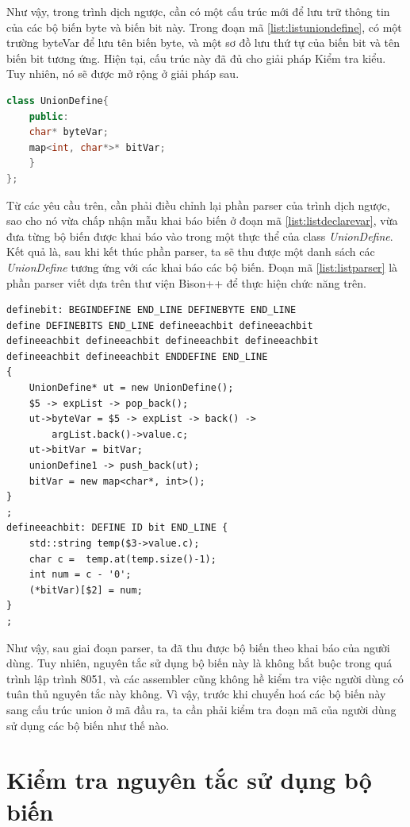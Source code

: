 Như vậy, trong trình dịch ngược, cần có một cấu trúc mới để lưu trữ thông tin của các bộ biến byte và biến bit này. Trong đoạn mã \ref{list:listuniondefine}, có một trường byteVar để lưu tên biến byte, và một sơ đồ lưu thứ tự của biến bit và tên biến bit tương ứng. Hiện tại, cấu trúc này đã đủ cho giải pháp Kiểm tra kiểu. Tuy nhiên, nó sẽ được mở rộng ở giải pháp sau. 
\begin{lstlisting}[caption={Cấu trúc dữ liệu để lưu trữ một bộ biến},label={list:listuniondefine},language=c++]
class UnionDefine{
	public:
	char* byteVar;
	map<int, char*>* bitVar;
	}
};
\end{lstlisting}
Từ các yêu cầu trên, cần phải điều chỉnh lại phần parser của trình dịch ngược, sao cho nó vừa chấp nhận mẫu khai báo biến ở đoạn mã \ref{list:listdeclarevar}, vừa đưa từng bộ biến được khai báo vào trong một thực thể của class \textit{UnionDefine}. Kết quả là, sau khi kết thúc phần parser, ta sẽ thu được một danh sách các \textit{UnionDefine} tương ứng với các khai báo các bộ biến. Đoạn mã \ref{list:listparser} là phần parser viết dựa trên thư viện Bison++ để thực hiện chức năng trên.\\
\begin{lstlisting}[caption={Đoạn mã parser cho phần khai báo bộ biến},label={list:listparser}]
definebit: BEGINDEFINE END_LINE DEFINEBYTE END_LINE 
define DEFINEBITS END_LINE defineeachbit defineeachbit
defineeachbit defineeachbit defineeachbit defineeachbit 
defineeachbit defineeachbit ENDDEFINE END_LINE
{
	UnionDefine* ut = new UnionDefine();
	$5 -> expList -> pop_back();
	ut->byteVar = $5 -> expList -> back() -> 
		argList.back()->value.c;
	ut->bitVar = bitVar;
	unionDefine1 -> push_back(ut);
	bitVar = new map<char*, int>();
}
;
defineeachbit: DEFINE ID bit END_LINE {
	std::string temp($3->value.c);
	char c =  temp.at(temp.size()-1);
	int num = c - '0';
	(*bitVar)[$2] = num;
}
;
\end{lstlisting}
Như vậy, sau giai đoạn parser, ta đã thu được bộ biến theo khai báo của người dùng. Tuy nhiên, nguyên tắc sử dụng bộ biến này là không bắt buộc trong quá trình lập trình 8051, và các assembler cũng không hề kiểm tra việc người dùng có tuân thủ nguyên tắc này không. Vì vậy, trước khi chuyển hoá các bộ biến này sang cấu trúc union ở mã đầu ra, ta cần phải kiểm tra đoạn mã của người dùng sử dụng các bộ biến như thế nào.

\section{Kiểm tra nguyên tắc sử dụng bộ biến}
